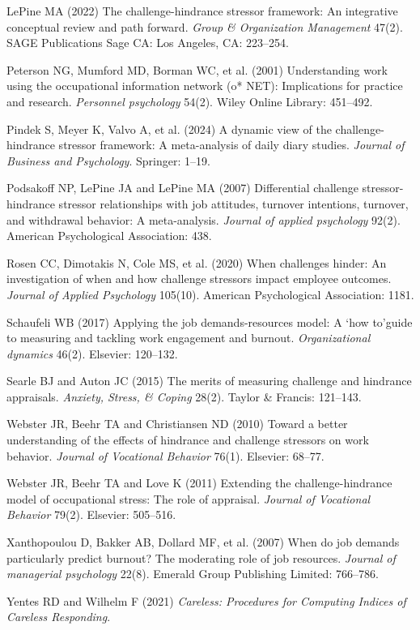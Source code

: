 \documentclass[
  man]{apa7}
\newlength{\cslhangindent}
\newenvironment{CSLReferences}[2] %
 {\begin{list}{}{%
  \setlength{\itemindent}{0pt}
  \setlength{\leftmargin}{0pt}
  \setlength{\parsep}{0pt}
  \ifodd #1
   \setlength{\leftmargin}{\cslhangindent}
   \setlength{\itemindent}{-1\cslhangindent}
  \fi
  \setlength{\itemsep}{#2\baselineskip}}}
 {\end{list}}
\begin{document}
\begin{CSLReferences}{1}{1}
LePine MA (2022) The challenge-hindrance stressor framework: An integrative conceptual review and path forward. \emph{Group \& Organization Management} 47(2). SAGE Publications Sage CA: Los Angeles, CA: 223--254.

Peterson NG, Mumford MD, Borman WC, et al. (2001) Understanding work using the occupational information network (o* NET): Implications for practice and research. \emph{Personnel psychology} 54(2). Wiley Online Library: 451--492.

Pindek S, Meyer K, Valvo A, et al. (2024) A dynamic view of the challenge-hindrance stressor framework: A meta-analysis of daily diary studies. \emph{Journal of Business and Psychology}. Springer: 1--19.

Podsakoff NP, LePine JA and LePine MA (2007) Differential challenge stressor-hindrance stressor relationships with job attitudes, turnover intentions, turnover, and withdrawal behavior: A meta-analysis. \emph{Journal of applied psychology} 92(2). American Psychological Association: 438.

Rosen CC, Dimotakis N, Cole MS, et al. (2020) When challenges hinder: An investigation of when and how challenge stressors impact employee outcomes. \emph{Journal of Applied Psychology} 105(10). American Psychological Association: 1181.

Schaufeli WB (2017) Applying the job demands-resources model: A `how to'guide to measuring and tackling work engagement and burnout. \emph{Organizational dynamics} 46(2). Elsevier: 120--132.

Searle BJ and Auton JC (2015) The merits of measuring challenge and hindrance appraisals. \emph{Anxiety, Stress, \& Coping} 28(2). Taylor \& Francis: 121--143.

Webster JR, Beehr TA and Christiansen ND (2010) Toward a better understanding of the effects of hindrance and challenge stressors on work behavior. \emph{Journal of Vocational Behavior} 76(1). Elsevier: 68--77.

Webster JR, Beehr TA and Love K (2011) Extending the challenge-hindrance model of occupational stress: The role of appraisal. \emph{Journal of Vocational Behavior} 79(2). Elsevier: 505--516.

Xanthopoulou D, Bakker AB, Dollard MF, et al. (2007) When do job demands particularly predict burnout? The moderating role of job resources. \emph{Journal of managerial psychology} 22(8). Emerald Group Publishing Limited: 766--786.

Yentes RD and Wilhelm F (2021) \emph{Careless: Procedures for Computing Indices of Careless Responding}.

\end{CSLReferences}

\endgroup
\end{document}
